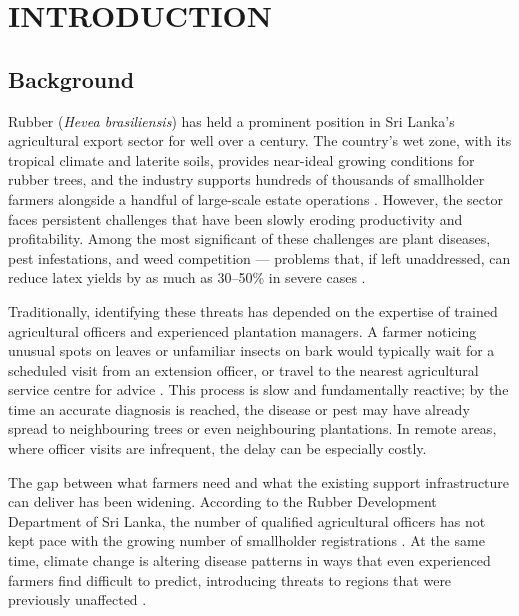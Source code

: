 \chapter{INTRODUCTION}

\section{Background}

Rubber (\textit{Hevea brasiliensis}) has held a prominent position in Sri Lanka's agricultural export sector for well over a century. The country's wet zone, with its tropical climate and laterite soils, provides near-ideal growing conditions for rubber trees, and the industry supports hundreds of thousands of smallholder farmers alongside a handful of large-scale estate operations \cite{ref1}. However, the sector faces persistent challenges that have been slowly eroding productivity and profitability. Among the most significant of these challenges are plant diseases, pest infestations, and weed competition --- problems that, if left unaddressed, can reduce latex yields by as much as 30--50\% in severe cases \cite{ref2}.

Traditionally, identifying these threats has depended on the expertise of trained agricultural officers and experienced plantation managers. A farmer noticing unusual spots on leaves or unfamiliar insects on bark would typically wait for a scheduled visit from an extension officer, or travel to the nearest agricultural service centre for advice \cite{ref3}. This process is slow and fundamentally reactive; by the time an accurate diagnosis is reached, the disease or pest may have already spread to neighbouring trees or even neighbouring plantations. In remote areas, where officer visits are infrequent, the delay can be especially costly.

The gap between what farmers need and what the existing support infrastructure can deliver has been widening. According to the Rubber Development Department of Sri Lanka, the number of qualified agricultural officers has not kept pace with the growing number of smallholder registrations \cite{ref4}. At the same time, climate change is altering disease patterns in ways that even experienced farmers find difficult to predict, introducing threats to regions that were previously unaffected \cite{ref5}.

